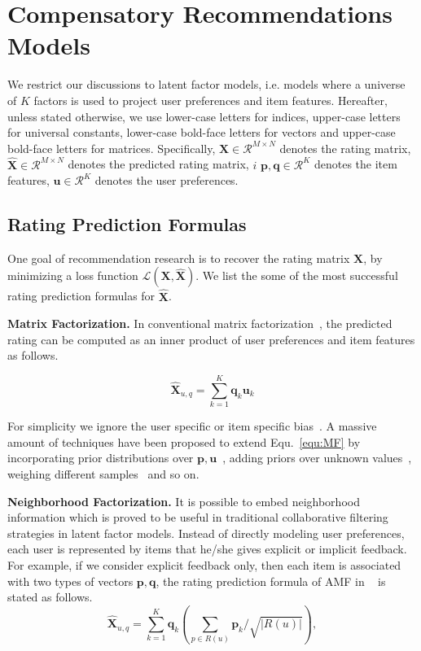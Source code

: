 \documentclass[letterpaper]{article} %
\newcommand{\Real}{\mathcal{R}}
\newcommand{\Rating}{\mathbf{X}}
\newcommand{\Loss}{\mathcal{L}}
\begin{document}
\section{Compensatory Recommendations Models}\label{sec:previousmodel}
We restrict our discussions to latent factor models, i.e. models where a universe of $K$ factors is used to project  user preferences and item features. Hereafter, unless stated otherwise, we use lower-case letters for indices, upper-case letters for universal constants, lower-case bold-face letters for vectors and upper-case bold-face letters for matrices. Specifically, $\mathbf{X}\in \Real^{M\times N}$ denotes the rating matrix, $\hat{\mathbf{X}}\in \Real^{M\times N}$ denotes the predicted rating matrix,  $i$ $\mathbf{p},\mathbf{q}\in \Real^K$ denotes the item features, $\mathbf{u}\in \Real^K$ denotes the user preferences.  

\subsection{Rating Prediction Formulas}
One goal of recommendation research is to recover the rating matrix $\Rating$, by minimizing a loss function $\Loss(\Rating,\hat{\Rating})$. We list the some of the most successful rating prediction formulas for $\hat{\Rating}$.

\textbf{Matrix Factorization.} In conventional matrix factorization~\cite{Koren2009Matrix}, the predicted rating can be computed as an inner product of user preferences and item features as follows.

\begin{equation}\label{equ:MF}
 \hat{\mathbf{X}}_{u,q}=\sum_{k=1}^{K} \mathbf{q}_k \mathbf{u}_k
\end{equation}

For simplicity we ignore the user specific or item specific bias~\cite{Koren2009Matrix}. A massive amount of techniques have been proposed to extend Equ.~\ref{equ:MF} by incorporating prior distributions over $\mathbf{p},\mathbf{u}$~\cite{salakhutdinov2008probabilistic}, adding priors over unknown values~\cite{Devooght2015Dynamic}, weighing different samples~\cite{Pil'aszy2010Fast} and so on.  

\textbf{Neighborhood Factorization.} It is possible to embed neighborhood information which is proved to be useful in traditional collaborative filtering strategies in latent factor models. Instead of directly modeling user preferences, each user is represented by items that he/she gives explicit or implicit feedback. For example, if we consider explicit feedback only, then each item is associated with two types of vectors $\mathbf{p},\mathbf{q}$, the rating prediction formula of AMF in ~\cite{Koren2008Factorization} is stated as follows.  
 \begin{equation}\label{equ:AMF}
\hat{\Rating}_{u,q}=\sum_{k=1}^{K} \mathbf{q}_{k} (\sum_{p \in R(u)} \mathbf{p}_k/\sqrt{|R(u)|} ),
\end{equation}
\end{document}
